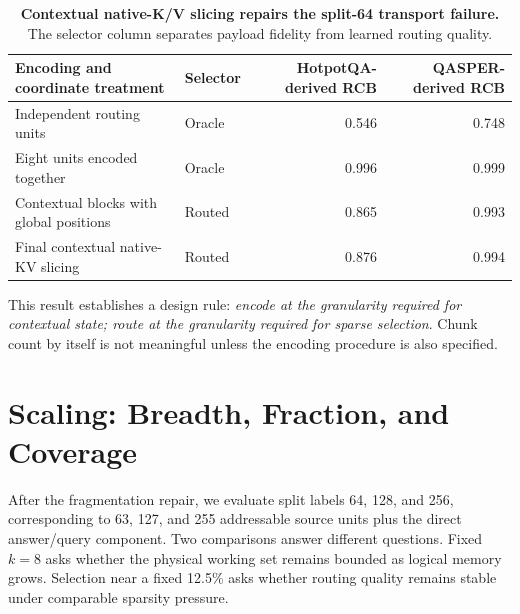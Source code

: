 \documentclass[11pt]{article}
\begin{document}
\begin{table}[H]
\centering
\small
\caption{\textbf{Contextual native-K/V slicing repairs the split-64 transport failure.}
The
selector column separates payload fidelity from learned routing quality.}
\label{tab:fragmentation}
\begin{tabularx}{\textwidth}{Xlrr}
\toprule
Encoding and coordinate treatment &
  Selector &
  HotpotQA-derived RCB &
  QASPER-derived RCB \\
\midrule
Independent routing units & Oracle & 0.546 & 0.748 \\
Eight units encoded together & Oracle & 0.996 & 0.999 \\
Contextual blocks with global positions & Routed & 0.865 & 0.993 \\
Final contextual native-KV slicing & Routed & 0.876 & 0.994 \\
\bottomrule
\end{tabularx}
\end{table}

This result establishes a design rule: \emph{encode at the granularity required for
contextual state; route at the granularity required for sparse selection}.
Chunk count by itself is not meaningful unless the encoding procedure is also specified.

\section{Scaling: Breadth, Fraction, and Coverage}
\label{sec:scaling}

After the fragmentation repair, we evaluate split labels 64, 128, and 256,
corresponding to 63, 127, and 255 addressable source units plus the direct answer/query
component. Two comparisons answer different questions.
Fixed $k=8$ asks whether the physical working set remains bounded as logical memory
grows. Selection near a fixed 12.5\% asks whether routing quality remains stable under
comparable sparsity pressure.
\end{document}
